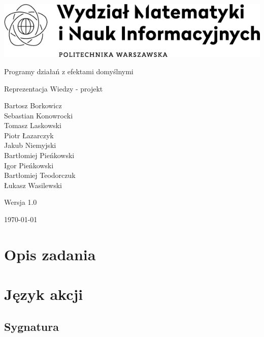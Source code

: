 \documentclass[11pt,a4paper]{article}
\begin{document}
    \begin{titlepage}
        \centering
        \includegraphics[width=\textwidth]{resources/WMiNI-znak-black.png} \par
        \vspace{3cm}
        {\LARGE Programy działań z efektami domyślnymi \par}
        \vspace{0.5cm}
        {\Large Reprezentacja Wiedzy - projekt \par}
        \vspace{2cm}
        {\large     	
            Bartosz Borkowicz \\
            Sebastian Konowrocki \\
            Tomasz Laskowski \\
            Piotr Łazarczyk \\
            Jakub Niemyjski \\
           	Bartłomiej Pieńkowski \\
            Igor Pieńkowski \\
            Bartłomiej Teodorczuk \\
            Łukasz Wasilewski
        \par}
        \vspace{4cm}
        {\large Wersja 1.0 \par}
        \vspace{0.5cm}
        {\large \today \par}
    \end{titlepage}

    \tableofcontents
    \newpage

    \section{Opis zadania}

	\section{Język akcji}
	
    \subsection{Sygnatura}
    
\end{document}
